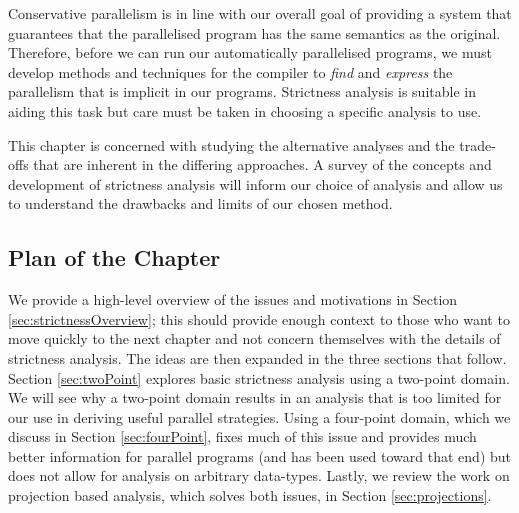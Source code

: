 Conservative parallelism is in line with our overall goal of providing a system
that guarantees that the parallelised program has the same semantics as the
original. Therefore, before we can run our automatically parallelised programs,
we must develop methods and techniques for the compiler to \emph{find} and
\emph{express} the parallelism that is implicit in our programs. Strictness
analysis is suitable in aiding this task but care must be taken in choosing a
specific analysis to use.

This chapter is concerned with studying the alternative analyses and the
trade-offs that are inherent in the differing approaches. A survey of the
concepts and development of strictness analysis will inform our choice of
analysis and allow us to understand the drawbacks and limits of our chosen
method.

\subsection*{Plan of the Chapter}

We provide a high-level overview of the issues and motivations in Section
\ref{sec:strictnessOverview}; this should provide enough context to those who
want to move quickly to the next chapter and not concern themselves with the
details of strictness analysis. The ideas are then expanded in the three
sections that follow. Section \ref{sec:twoPoint} explores basic strictness
analysis using a two-point domain. We will see why a two-point domain results
in an analysis that is too limited for our use in deriving useful parallel
strategies. Using a four-point domain, which we discuss in Section
\ref{sec:fourPoint}, fixes much of this issue and provides much better
information for parallel programs (and has been used toward that end) but does
not allow for analysis on arbitrary data-types. Lastly, we review the work on
projection based analysis, which solves both issues, in Section
\ref{sec:projections}.

